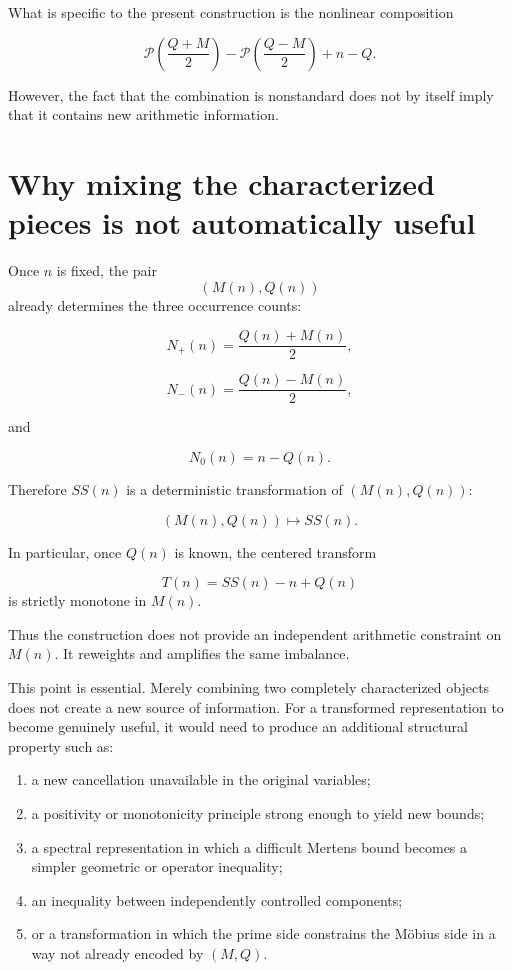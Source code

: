 \documentclass[11pt]{amsart}
\newcommand{\Mert}{M}
\newcommand{\Sq}{Q}
\newcommand{\PS}{\mathcal P}
\begin{document}
What is specific to the present construction is the nonlinear composition

\[
\PS\!\left(\frac{\Sq+\Mert}{2}\right)
-
\PS\!\left(\frac{\Sq-\Mert}{2}\right)
+
n-\Sq.
\]

However, the fact that the combination is nonstandard does not by itself imply that it contains new arithmetic information.

\section{Why mixing the characterized pieces is not automatically useful}

Once $n$ is fixed, the pair
\[
(\Mert(n),\Sq(n))
\]
already determines the three occurrence counts:

\[
N_+(n)=\frac{\Sq(n)+\Mert(n)}2,
\]

\[
N_-(n)=\frac{\Sq(n)-\Mert(n)}2,
\]

and

\[
N_0(n)=n-\Sq(n).
\]

Therefore $SS(n)$ is a deterministic transformation of $(\Mert(n),\Sq(n))$:

\[
\boxed{
(\Mert(n),\Sq(n))
\longmapsto
SS(n).
}
\]

In particular, once $\Sq(n)$ is known, the centered transform

\[
T(n)=SS(n)-n+\Sq(n)
\]
is strictly monotone in $\Mert(n)$.

Thus the construction does not provide an independent arithmetic constraint on $\Mert(n)$. It reweights and amplifies the same imbalance.

This point is essential. Merely combining two completely characterized objects does not create a new source of information. For a transformed representation to become genuinely useful, it would need to produce an additional structural property such as:

\begin{enumerate}[label=(\roman*)]
\item a new cancellation unavailable in the original variables;
\item a positivity or monotonicity principle strong enough to yield new bounds;
\item a spectral representation in which a difficult Mertens bound becomes a simpler geometric or operator inequality;
\item an inequality between independently controlled components;
\item or a transformation in which the prime side constrains the M\"obius side in a way not already encoded by $(\Mert,\Sq)$.
\end{enumerate}
\end{document}
